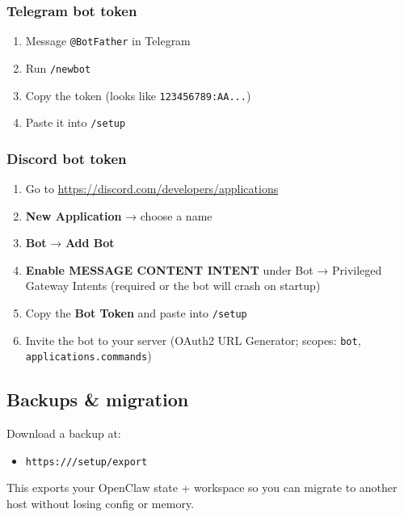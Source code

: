 \subsubsection{Telegram bot token}


\begin{enumerate}
  \item Message \texttt{@BotFather} in Telegram
  \item Run \texttt{/newbot}
  \item Copy the token (looks like \texttt{123456789:AA...})
  \item Paste it into \texttt{/setup}
\end{enumerate}


\subsubsection{Discord bot token}


\begin{enumerate}
  \item Go to \href{https://discord.com/developers/applications}{https://discord.com/developers/applications}
  \item \textbf{New Application} → choose a name
  \item \textbf{Bot} → \textbf{Add Bot}
  \item \textbf{Enable MESSAGE CONTENT INTENT} under Bot → Privileged Gateway Intents (required or the bot will crash on startup)
  \item Copy the \textbf{Bot Token} and paste into \texttt{/setup}
  \item Invite the bot to your server (OAuth2 URL Generator; scopes: \texttt{bot}, \texttt{applications.commands})
\end{enumerate}


\subsection{Backups \& migration}


Download a backup at:

\begin{itemize}
  \item \texttt{https:///setup/export}
\end{itemize}


This exports your OpenClaw state + workspace so you can migrate to another host without losing config or memory.


\clearpage

